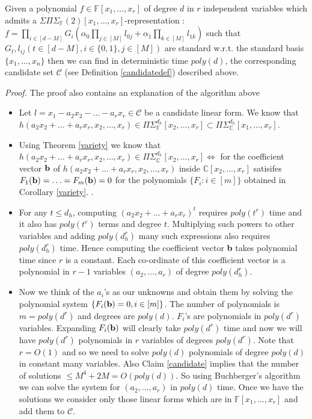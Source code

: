 \documentclass[letterpaper,USenglish,numberwithinsect]{lipics}
\newcommand{\F}{\mathbb{F}}
\newcommand{\C}{\mathbb{C}}
\newcommand{\MC}{\mathcal{C}}
\begin{document}
\begin{lemma}
Given a polynomial $f \in \F[x_1,\ldots,x_r]$ of degree $d$ in
$r$ independent variables
which admits a $\Sigma\Pi\Sigma_\F(2)[x_1,\ldots,x_r]$-representation : $f =
\prod\limits_{i\in [d-M]}G_i(\alpha_0\prod\limits_{j\in[M]}l_{0j} +
\alpha_1\prod\limits_{k\in[M]}l_{1k} )$ such that $G_t,l_{ij} (t\in [d-M], i\in \{0,1\}, j\in [M])$ are standard w.r.t. the
standard basis $\{x_1,\ldots,x_n\}$ then we can find in deterministic time $poly(d)$,
the corresponding candidate set $\MC$ (see Definition \ref{candidatedef}) described above.
\end{lemma}

\emph{Proof.}
The proof also contains an explanation of the algorithm above
\begin{itemize}
\item Let $l = x_1-a_2x_2-\ldots -a_rx_r \in \MC$ be a candidate linear form. We know
that $h(a_2x_2+\ldots + a_rx_r,x_2,\ldots,x_r)\in
\Pi\Sigma^{d_h}_\F[x_2,\ldots,x_r]\subset \Pi\Sigma^{d_h}_\C[x_1,\ldots,x_r]$.
\item Using Theorem \ref{variety} we know that
$h(a_2x_2+\ldots + a_rx_r,x_2,\ldots,x_r) \in
\Pi\Sigma^{d_h}_\C[x_2,\ldots,x_r]\Leftrightarrow$ for the coefficient vector ${\bf b}$ of $h(a_2x_2+\ldots + a_rx_r,x_2,\ldots,x_r)$ inside
$\C[x_2,\ldots,x_r]$ satisifes $F_1({\bf b})=\ldots=F_m({\bf b})=0$ for the polynomials $\{F_i : i\in [m]\}$ obtained in Corollary \ref{variety}.
.
\item For any $t\leq d_h$, computing $(a_2x_2+\ldots + a_rx_r)^t$ requires $poly(t^r)$ time and it also has
$poly(t^r)$  terms and degree $t$. Multiplying such powers to other variables  and
adding $poly(d_h^r)$ many such expressions also requires $poly(d_h^r)$ time.
Hence computing the coefficient vector {\bf b} takes polynomial time since $r$ is a constant. Each co-ordinate of
this coefficient vector is a polynomial in $r-1$ variables $(a_2,\ldots,a_r)$ of degree $poly(d_h^r)$.

\item Now we think of the $a_i$'s as our unknowns and obtain them by solving the
polynomial system $\{F_i({\bf b}) =0, i\in [m]\}$. The number of polynomials
is $m=poly(d^r)$ and degrees are $poly(d)$. $F_i$'s are polynomials in $poly(d^r)$ variables. Expanding $F_i({\bf b})$
will clearly take $poly(d^r)$ time and now we will have $poly(d^r)$ polynomials in $r$ variables of degrees $poly(d^r)$. Note that
$r=O(1)$ and so we need to solve $poly(d)$ polynomials of degree $poly(d)$ in constant many variables. Also Claim \ref{candidate} implies that the number
 of solutions $\leq M^4+2M = O(poly(d))$. So using Buchberger's algorithm \cite{Buchberger76} we can solve the system
 for $(a_2,\ldots,a_r)$ in $poly(d)$ time. Once we have the solutions we consider only those linear
forms which are in $\F[x_1,\ldots,x_r]$ and add them to $\MC$.
\end{itemize}
\end{document}
